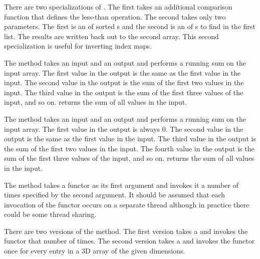 \begin{description}
  There are two specializations of . The first takes
  an additional comparison function that defines the less-than
  operation. The second takes only two parameters. The first is an
   of sorted s and the second is an
   of s to find in the first list. The
  results are written back out to the second array. This second
  specialization is useful for inverting index maps.
\item[\textcode{ScanInclusive}]  The
   method takes an input and an output
   and performs a running sum on the input
  array. The first value in the output is the same as the first value in
  the input. The second value in the output is the sum of the first two
  values in the input. The third value in the output is the sum of the
  first three values of the input, and so on. 
  returns the sum of all values in the input.
\item[\textcode{ScanExclusive}]  The
   method takes an input and an output
   and performs a running sum on the input
  array. The first value in the output is always 0. The second value in the
  output is the same as the first value in the input. The third value in
  the output is the sum of the first two values in the input. The fourth
  value in the output is the sum of the first three values of the input,
  and so on.  returns the sum of all values in the
  input.
\item[\textcode{Schedule}]  The  method
  takes a functor as its first argument and invokes it a number of times
  specified by the second argument. It should be assumed that each
  invocation of the functor occurs on a separate thread although in
  practice there could be some thread sharing.

  There are two versions of the  method. The first
  version takes a  and invokes the functor that number of
  times. The second version takes a  and invokes the functor once
  for every entry in a 3D array of the given dimensions.


\end{description}
